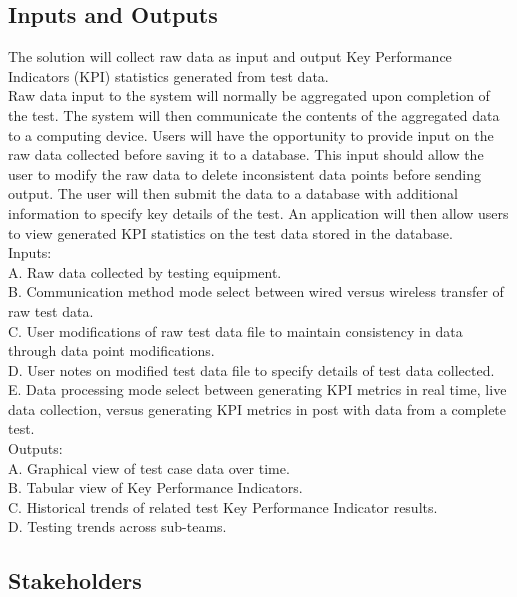 \documentclass{article}
\begin{document}
\subsection{Inputs and Outputs}


The solution will collect raw data as input and output Key Performance Indicators (KPI) statistics generated from test data. \\

Raw data input to the system will normally be aggregated upon completion of the test. The system will then communicate the contents of the aggregated data to a computing device. Users will have the opportunity to provide input on the raw data collected before saving it to a database. This input should allow the user to modify the raw data to delete inconsistent data points before sending output. The user will then submit the data to a database with additional information to specify key details of the test. An application will then allow users to view generated KPI statistics on the test data stored in the database. \\

Inputs: \\
A. Raw data collected by testing equipment. \\
B. Communication method mode select between wired versus wireless transfer of raw test data. \\
C. User modifications of raw test data file to maintain consistency in data through data point modifications. \\
D. User notes on modified test data file to specify details of test data collected. \\
E. Data processing mode select between generating KPI metrics in real time, live data collection, versus generating KPI metrics in post with data from a complete test. \\

Outputs: \\
A. Graphical view of test case data over time. \\
B. Tabular view of Key Performance Indicators. \\
C. Historical trends of related test Key Performance Indicator results. \\
D. Testing trends across sub-teams. \newpage

\subsection{Stakeholders}
\end{document}
